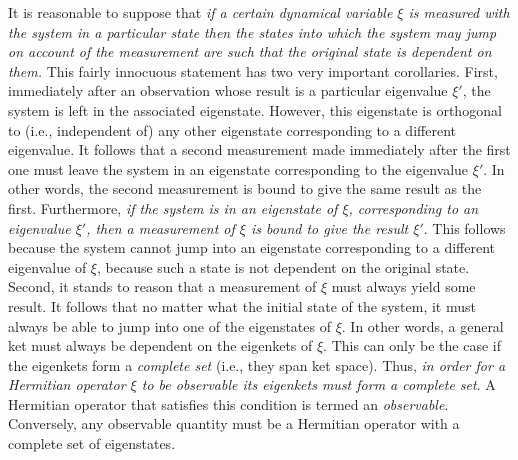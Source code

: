 It is reasonable to suppose that {\em if a certain dynamical variable
$\xi$ is measured with the system in a particular state then the states
into which the system may jump on account of the measurement are such
that the original state is dependent on them.} This fairly innocuous
statement has two very important corollaries. First, immediately after an
observation whose result is a particular eigenvalue $\xi'$,  the system
is left in the associated eigenstate. However, this eigenstate is 
orthogonal to ({\rm i.e.}, independent of) any other eigenstate corresponding
to a different eigenvalue. It follows that a second measurement made
immediately after the first one must leave the system in an eigenstate
corresponding to the eigenvalue $\xi'$. In other words, the second measurement is
bound to give the same result as the first. Furthermore, {\em if the system is
in an eigenstate of $\xi$, corresponding to an eigenvalue $\xi'$, then
a measurement of $\xi$ is bound to give the result $\xi'$}. This follows
because the system cannot jump into an eigenstate corresponding to a
different eigenvalue of $\xi$, because such a state is not dependent on
the original state. Second, it stands to reason that a measurement
of $\xi$ must always yield some result. It follows that no matter what
the initial state of the system, it must always be able to jump into one
of the eigenstates of $\xi$. In other words, a general ket must  always
be dependent on the eigenkets of $\xi$. This can  only be the case if the eigenkets
form a {\em complete set}\/ ({\rm i.e.}, they span ket space). Thus, {\em in order for
a Hermitian operator $\xi$ to be observable its eigenkets must form a complete set}.
A Hermitian  operator that satisfies this condition is termed an {\em observable}. 
Conversely, any observable quantity must be a Hermitian operator with a
complete set of eigenstates.

